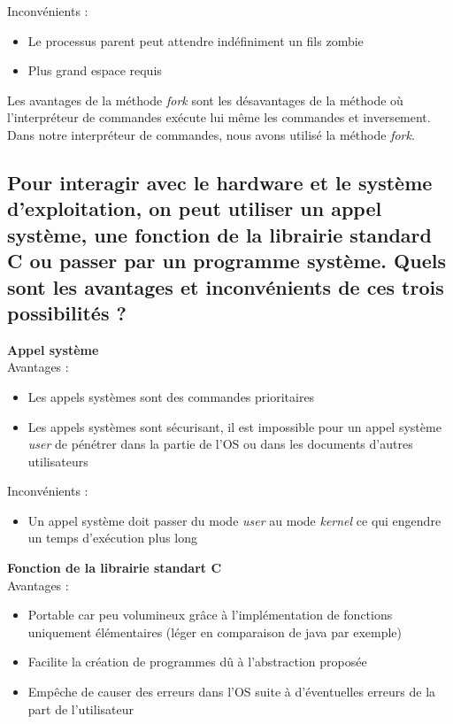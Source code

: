 \documentclass[10pt,a4paper]{article}
\begin{document}
Inconvénients :
\begin{itemize}
\item Le processus parent peut attendre indéfiniment un fils zombie

\item Plus grand espace requis
\end{itemize}

Les avantages de la méthode \textit{fork} sont les désavantages de la méthode où l'interpréteur de commandes exécute lui même les commandes et inversement. Dans notre interpréteur de commandes, nous avons utilisé la méthode \textit{fork}. 

\subsection*{Pour interagir avec le hardware et le système d'exploitation, on peut utiliser un appel système, une  fonction  de  la  librairie  standard  C  ou  passer  par  un  programme  système.  Quels  sont  les avantages et inconvénients de ces trois possibilités ?}

\textbf{Appel système\\}
Avantages :
\begin{itemize}
\item Les appels systèmes sont des commandes prioritaires 
\item Les appels systèmes sont sécurisant, il est impossible pour un appel système \textit{user} de pénétrer dans la partie de l'OS ou dans les documents d'autres utilisateurs 
\end{itemize}

Inconvénients : 
\begin{itemize}
\item Un appel système doit passer du mode \textit{user} au mode \textit{kernel} ce qui engendre un temps d'exécution plus long 
\end{itemize}

\textbf{Fonction de la librairie standart C\\}
Avantages :
\begin{itemize}
\item Portable car peu volumineux grâce à l'implémentation de fonctions uniquement élémentaires (léger en comparaison de java par exemple)

\item Facilite la création de programmes dû à l'abstraction proposée
\item Empêche de causer des erreurs dans l'OS suite à d'éventuelles erreurs de la part de l'utilisateur
\end{itemize}
\end{document}
